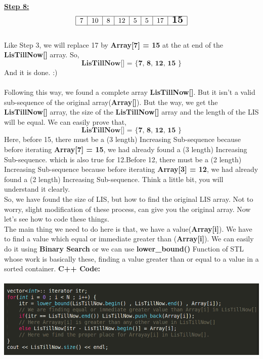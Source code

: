 \documentclass[12pt]{article}
\begin{document}
\newpage
\large{\textbf{\underline{Step 8:}}} 
$$
\begin{tabular}{|c|c|c|c|c|c|c|c|} \hline
      7 & 10 & 8 & 12 & 5 & 5 & 17 &\Large{\textbf{15}}\\ \hline
\end{tabular}
$$ \\
\normalsize{Like Step 3, we will replace 17 by \textbf{Array[7] = 15} at the at end of the \textbf{LisTillNow[]} array. So, } $$ \textbf{LisTillNow[] = \{ 7, 8, 12, 15 \}} $$
And it is done. :) \\ \\ 
Following this way, we found a complete array \textbf{LisTillNow[]}. But it isn't a valid sub-sequence of the original array(\textbf{Array[]}). But the way, we get the \textbf{LisTillNow[]} array, the size of the \textbf{LisTillNow[]} array and the length of the LIS will be equal. We can easily prove that, $$ \textbf{LisTillNow[] = \{ 7, 8, 12, 15 \}} $$ Here, before 15, there must be a (3 length) Increasing Sub-sequence because before iterating \textbf{Array[7] = 15}, we had already found a (3 length) Increasing Sub-sequence. which is also true for 12.Before 12, there must be a (2 length) Increasing Sub-sequence because before iterating \textbf{Array[3] = 12}, we had already found a (2 length) Increasing Sub-sequence. Think a little bit, you will understand it clearly.\\
So, we have found the size of LIS, but how to find the original LIS array. Not to worry, slight modification of these process, can give you the original array.
\newpage
Now let's see how to code these things.\\
The main thing we need to do here is that, we have a value(\textbf{Array[i]}). We have to find a value which equal or immediate greater than (\textbf{Array[i]}). We can easily do it using \textbf{Binary Search} or we can use \textbf{lower\_bound()} Function of STL whose work is basically these, finding a value greater than or equal to a value in a sorted container.
\textbf{C++ Code:} \\ \\
\includegraphics[width=\textwidth]{LIS} \\
\end{document}
